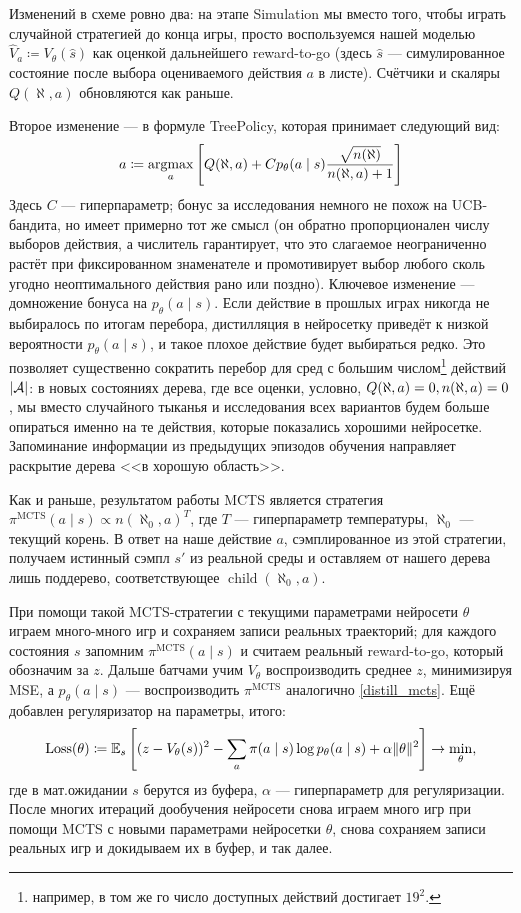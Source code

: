 Изменений в схеме ровно два: на этапе Simulation мы вместо того, чтобы играть случайной стратегией до конца игры, просто воспользуемся нашей моделью $\hat{V}_a \coloneqq V_{\theta}(\hat{s})$ как оценкой дальнейшего reward-to-go (здесь $\hat{s}$ --- симулированное состояние после выбора оцениваемого действия $a$ в листе). Счётчики и скаляры $Q(\aleph, a)$ обновляются как раньше.

Второе изменение --- в формуле TreePolicy, которая принимает следующий вид:
$$a \coloneqq \mathop{\mathrm{argmax}}\limits_a \left[ Q(\aleph, a) + C p_{\theta}(a \mid s) \frac{\sqrt{ n(\aleph)}}{n(\aleph, a) + 1} \right]$$
Здесь $C$ --- гиперпараметр; бонус за исследования немного не похож на UCB-бандита, но имеет примерно тот же смысл (он обратно пропорционален числу выборов действия, а числитель гарантирует, что это слагаемое неограниченно растёт при фиксированном знаменателе и промотивирует выбор любого сколь угодно неоптимального действия рано или поздно). Ключевое изменение --- домножение бонуса на $p_{\theta}(a \mid s)$. Если действие в прошлых играх никогда не выбиралось по итогам перебора, дистилляция в нейросетку приведёт к низкой вероятности $p_{\theta}(a \mid s)$, и такое плохое действие будет выбираться редко. Это позволяет существенно сократить перебор для сред с большим числом\footnote{например, в том же го число доступных действий достигает $19^2$.} действий $|\mathcal{A}|$: в новых состояниях дерева, где все оценки, условно, $Q(\aleph, a) \HM= 0, n(\aleph, a) \HM= 0$, мы вместо случайного тыканья и исследования всех вариантов будем больше опираться именно на те действия, которые показались хорошими нейросетке. Запоминание информации из предыдущих эпизодов обучения направляет раскрытие дерева <<в хорошую область>>.

Как и раньше, результатом работы MCTS является стратегия $\pi^{\mathrm{MCTS}}(a \mid s) \propto n(\aleph_0, a)^T$, где $T$ --- гиперпараметр температуры, $\aleph_0$ --- текущий корень. В ответ на наше действие $a$, сэмплированное из этой стратегии, получаем истинный сэмпл $s'$ из реальной среды и оставляем от нашего дерева лишь поддерево, соответствующее $\operatorname{child}(\aleph_0, a)$.

При помощи такой MCTS-стратегии с текущими параметрами нейросети $\theta$ играем много-много игр и сохраняем записи реальных траекторий; для каждого состояния $s$ запомним $\pi^{\mathrm{MCTS}}(a \mid s)$ и считаем реальный reward-to-go, который обозначим за $z$. Дальше батчами учим $V_\theta$ воспроизводить среднее $z$, минимизируя MSE, а $p_{\theta}(a \mid s)$ --- воспроизводить $\pi^{\mathrm{MCTS}}$ аналогично \eqref{distill_mcts}. Ещё добавлен регуляризатор на параметры, итого:
$$\operatorname{Loss}(\theta) \coloneqq \mathbb{E}_{s} \left[ (z - V_\theta(s))^2 - \sum_a \pi(a \mid s) \log p_{\theta}(a \mid s) + \alpha \| \theta \|^2 \right] \to \min_\theta,$$
где в мат.ожидании $s$ берутся из буфера, $\alpha$ --- гиперпараметр для регуляризации. После многих итераций дообучения нейросети снова играем много игр при помощи MCTS с новыми параметрами нейросетки $\theta$, снова сохраняем записи реальных игр и докидываем их в буфер, и так далее.

